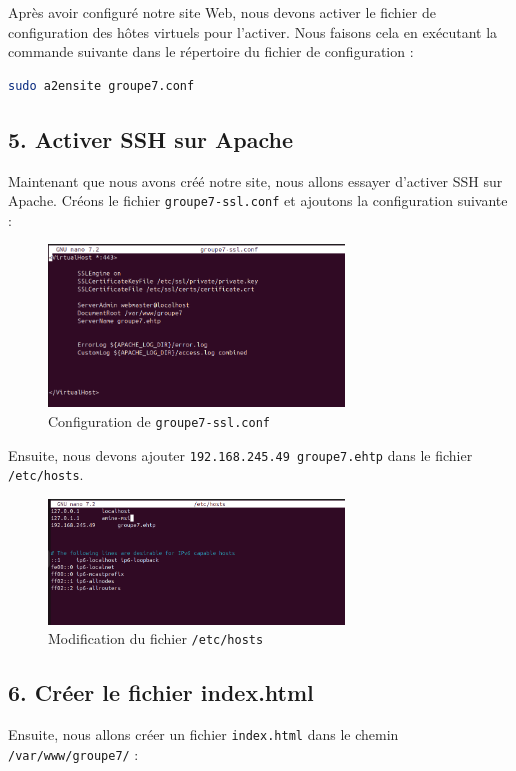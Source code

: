 Après avoir configuré notre site Web, nous devons activer le fichier de configuration des hôtes virtuels pour l'activer. Nous faisons cela en exécutant la commande suivante dans le répertoire du fichier de configuration :

\begin{lstlisting}[language=bash]
sudo a2ensite groupe7.conf
\end{lstlisting}

\subsection*{5. Activer SSH sur Apache}
Maintenant que nous avons créé notre site, nous allons essayer d'activer SSH sur Apache. Créons le fichier \texttt{groupe7-ssl.conf} et ajoutons la configuration suivante :

\begin{figure}[h]
	\centering
	\includegraphics[width=0.7\textwidth]{HTTPS/groupe7-ssl-conf.png}
	\caption{Configuration de \texttt{groupe7-ssl.conf}}
	\label{fig:groupe7sslconf}
\end{figure}

Ensuite, nous devons ajouter \texttt{192.168.245.49 groupe7.ehtp} dans le fichier \texttt{/etc/hosts}.
\newpage

\begin{figure}[h]
	\centering
	\includegraphics[width=0.7\textwidth]{HTTPS/host.png}
	\caption{Modification du fichier \texttt{/etc/hosts}}
	\label{fig:hosts}
\end{figure}

\subsection*{6. Créer le fichier index.html}
Ensuite, nous allons créer un fichier \texttt{index.html} dans le chemin \texttt{/var/www/groupe7/} :		

